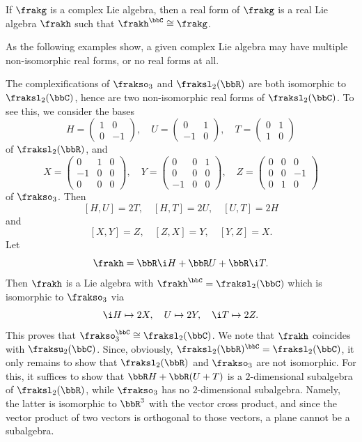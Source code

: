 \begin{defn}
    If $\frakg$ is a complex Lie algebra, then a real form of $\frakg$ is a real Lie algebra $\frakh$ such that $\frakh^\bbC\cong\frakg$.
\end{defn}

As the following examples show, a given complex Lie algebra may have multiple non-isomorphic real forms, or no real forms at all.

\begin{example}
    The complexifications of $\frakso_3$ and $\fraksl_2(\bbR)$ are both isomorphic to $\fraksl_2(\bbC)$, hence are two non-isomorphic real forms of $\fraksl_2(\bbC)$. To see this, we consider the bases 
    \[H=\begin{pmatrix}
        1 & 0\\0 & -1
    \end{pmatrix},\quad U=\begin{pmatrix}
        0 & 1\\ -1 & 0
    \end{pmatrix},\quad T=\begin{pmatrix}
        0 & 1\\ 1 & 0
    \end{pmatrix}\]
    of $\fraksl_2(\bbR)$, and 
    \[X=\begin{pmatrix}
        0 & 1 & 0\\
        -1 & 0 & 0\\
        0 & 0 & 0
    \end{pmatrix},\quad 
    Y=\begin{pmatrix}
        0 & 0 & 1\\
        0 & 0 & 0\\
        -1 & 0 & 0
    \end{pmatrix},\quad 
    Z=\begin{pmatrix}
        0 & 0 & 0\\
        0 & 0 & -1\\
        0 & 1 & 0
    \end{pmatrix}\]
    of $\frakso_3$. Then 
    \[[H,U]=2T,\quad [H,T]=2U,\quad [U,T]=2H\]
    and 
    \[[X,Y]=Z,\quad [Z,X]=Y,\quad [Y,Z]=X.\]
    Let 
    \[\frakh=\bbR\i H+\bbR U+\bbR \i T.\]
    Then $\frakh$ is a Lie algebra with $\frakh^\bbC=\fraksl_2(\bbC)$ which is isomorphic to $\frakso_3$ via 
    \[\i H\mapsto 2X,\quad U\mapsto 2Y,\quad \i T\mapsto 2Z.\]
    This proves that $\frakso_3^\bbC\cong\fraksl_2(\bbC)$. We note that $\frakh$ coincides with $\fraksu_2(\bbC)$. Since, obviously, $\fraksl_2(\bbR)^\bbC=\fraksl_2(\bbC)$, it only remains to show that $\fraksl_2(\bbR)$ and $\frakso_3$ are not isomorphic. For this, it suffices to show that $\bbR H+\bbR (U+T)$ is a $2$-dimensional subalgebra of $\fraksl_2(\bbR)$, while $\frakso_3$ has no $2$-dimensional subalgebra. Namely, the latter is isomorphic to $\bbR^3$ with the vector cross product, and since the vector product of two vectors is orthogonal to those vectors, a plane cannot be a subalgebra.
\end{example}


